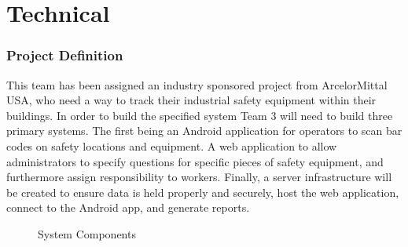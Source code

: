 \documentclass[Letter,11pt]{article}
\begin{document}
\part{Technical}
\section{Project Definition}\label{def}
	This team has been assigned an industry sponsored project from ArcelorMittal USA, who need a way to track their industrial safety equipment within their buildings. In order to build the specified system Team 3 will need to build three primary systems. The first being an Android application for operators to scan bar codes on safety locations and equipment. A web application to allow administrators to specify questions for specific pieces of safety equipment, and furthermore assign responsibility to workers. Finally, a server infrastructure will be created to ensure data is held properly and securely, host the web application, connect to the Android app, and generate reports. 
			
	\begin{figure}[h]
		\centering
		
		\caption{\label{sysConn} System Components}
	\end{figure}
	
\end{document}
